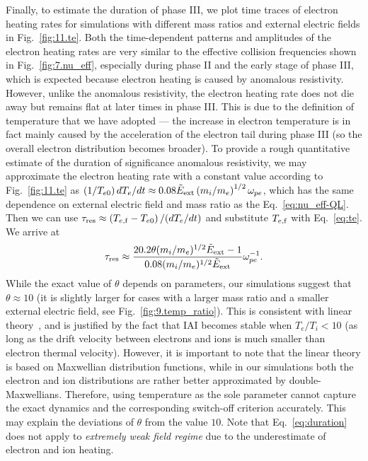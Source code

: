 \documentclass[%
 reprint,
 amsmath,
 amssymb,
 aps,
 prx,
floatfix,
superscriptaddress
]{revtex4-2}
\begin{document}
Finally, to estimate the duration of phase III, we plot time traces of electron heating rates for simulations with different mass ratios and external electric fields in Fig.~\ref{fig:11.te}.
Both the time-dependent patterns and amplitudes of the electron heating rates are very similar to the effective collision frequencies shown in Fig.~\ref{fig:7.nu_eff}, especially during phase II and the early stage of phase III, which is expected because electron heating is caused by anomalous resistivity.
However, unlike the anomalous resistivity, the electron heating rate does not die away but remains flat at later times in phase III.
This is due to the definition of temperature that we have adopted --- the increase in electron temperature is in fact mainly caused by the acceleration of the electron tail during phase III (so the overall electron distribution becomes broader). 
To provide a rough quantitative estimate of the duration of significance anomalous resistivity, we may approximate the electron heating rate with a constant value according to Fig.~\ref{fig:11.te} as $ \left(1/T_{e0} \right) dT_e/dt \approx 0.08 \tilde{E}_{\rm{ext}}  \left(m_i/m_e\right)^{1/2} \omega_{pe}$, which has the same dependence on external electric field and mass ratio as the Eq.~\eqref{eq:nu_eff-QL}.
Then we can use $\tau_{\rm{res}} \approx \left(T_{e,\rm{f}} - T_{e0}\right) / (d T_e /dt )$ and substitute $T_{e,\rm f}$ with Eq.~\eqref{eq:te}. We arrive at
\begin{equation}
\label{eq:duration}
    \tau_{\rm{res}} \approx \frac{20.2 \theta (m_i/m_e)^{1/2}\tilde{E}_{\rm{ext}} -1 }{0.08 (m_i/m_e)^{1/2}\tilde{E}_{\rm{ext}}} \omega_{pe}^{-1}.
\end{equation}
While the exact value of $\theta$ depends on parameters, our simulations suggest that $\theta \approx 10$ (it is slightly larger for cases with a larger mass ratio and a smaller external electric field, see Fig.~\ref{fig:9.temp_ratio}). 
This is consistent with linear theory~\cite{papadopoulos1977review,benz2012plasma}, and is justified by the fact that IAI becomes stable when $T_e/T_i<10$ (as long as the drift velocity between electrons and ions is much smaller than electron thermal velocity).
However, it is important to note that the linear theory is based on Maxwellian distribution functions, while in our simulations both the electron and ion distributions are rather better approximated by double-Maxwellians.
Therefore, using temperature as the sole parameter cannot capture the exact dynamics and the corresponding switch-off criterion accurately. This may explain the deviations of $\theta$ from the value $10$. 
Note that Eq.~\eqref{eq:duration} does not apply to {\it extremely weak field regime} due to the underestimate of electron and ion heating.
\end{document}

